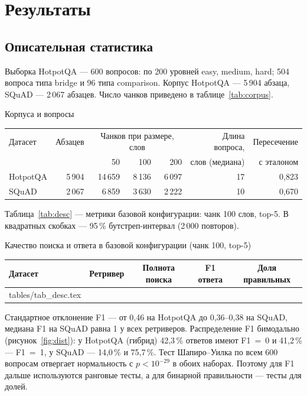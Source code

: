 \section{Результаты}

\subsection{Описательная статистика}

Выборка HotpotQA --- 600 вопросов: по 200 уровней easy, medium, hard; 504 вопроса типа bridge и 96 типа comparison. Корпус HotpotQA --- 5\,904 абзаца, SQuAD --- 2\,067 абзацев. Число чанков приведено в таблице~\ref{tab:corpus}.

\begin{gosttable}{Корпуса и вопросы}\label{tab:corpus}
\begin{tabular}{lrrrrrr}
\toprule
Датасет & Абзацев & \multicolumn{3}{c}{Чанков при размере, слов} & Длина вопроса, & Пересечение \\
 & & 50 & 100 & 200 & слов (медиана) & с эталоном\footnotemark \\
\midrule
HotpotQA & 5\,904 & 14\,659 & 8\,136 & 6\,097 & 17 & 0,823 \\
SQuAD & 2\,067 & 6\,859 & 3\,630 & 2\,222 & 10 & 0,670 \\
\bottomrule
\end{tabular}
\end{gosttable}

Таблица~\ref{tab:desc} --- метрики базовой конфигурации: чанк 100 слов, top-5. В квадратных скобках --- 95\,\% бутстреп-интервал (2\,000 повторов).

\begin{gosttable}{Качество поиска и ответа в базовой конфигурации (чанк 100, top-5)}\label{tab:desc}
\begin{tabular}{llccc}
\toprule
Датасет & Ретривер & Полнота поиска & F1 ответа & Доля правильных \\
\midrule
{} tables/tab_desc.tex 
\bottomrule
\end{tabular}
\end{gosttable}

Стандартное отклонение F1 --- от 0,46 на HotpotQA до 0,36--0,38 на SQuAD, медиана F1 на SQuAD равна 1 у всех ретриверов. Распределение F1 бимодально (рисунок~\ref{fig:dist}): у HotpotQA (гибрид) 42,3\,\% ответов имеют F1~=~0 и 41,2\,\% --- F1~=~1, у SQuAD --- 14,0\,\% и 75,7\,\%. Тест Шапиро--Уилка по всем 600 вопросам отвергает нормальность с $p < 10^{-29}$ в обоих наборах. Поэтому для F1 дальше используются ранговые тесты, а для бинарной правильности --- тесты для долей.

